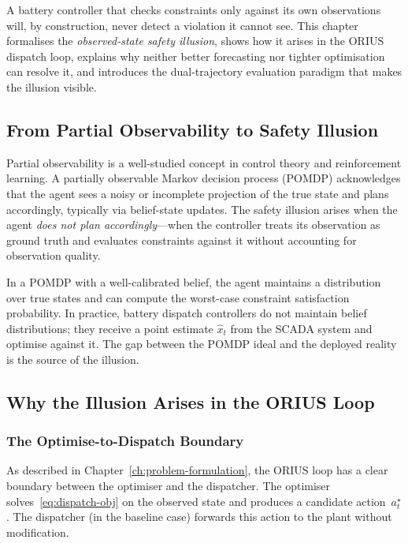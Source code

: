 A battery controller that checks constraints only against its own
observations will, by construction, never detect a violation it cannot
see.  This chapter formalises the \emph{observed-state safety illusion},
shows how it arises in the ORIUS dispatch loop, explains why neither
better forecasting nor tighter optimisation can resolve it, and introduces
the dual-trajectory evaluation paradigm that makes the illusion visible.

\subsection{From Partial Observability to Safety Illusion}

Partial observability is a well-studied concept in control theory and
reinforcement learning.  A partially observable Markov decision process
(POMDP) acknowledges that the agent sees a noisy or incomplete projection
of the true state and plans accordingly, typically via belief-state
updates.  The safety illusion arises when the agent \emph{does not plan
accordingly}---when the controller treats its observation as ground truth
and evaluates constraints against it without accounting for observation
quality.

In a POMDP with a well-calibrated belief, the agent maintains a
distribution over true states and can compute the worst-case constraint
satisfaction probability.  In practice, battery dispatch controllers do
not maintain belief distributions; they receive a point estimate
$\hat{x}_t$ from the SCADA system and optimise against it.  The gap
between the POMDP ideal and the deployed reality is the source of the
illusion.


\subsection{Why the Illusion Arises in the ORIUS Loop}

\subsubsection{The Optimise-to-Dispatch Boundary}

As described in Chapter~\ref{ch:problem-formulation}, the ORIUS loop
has a clear boundary between the optimiser and the dispatcher.  The
optimiser solves~\eqref{eq:dispatch-obj} on the observed state and
produces a candidate action~$a_t^{\star}$.  The dispatcher (in the
baseline case) forwards this action to the plant without modification.

